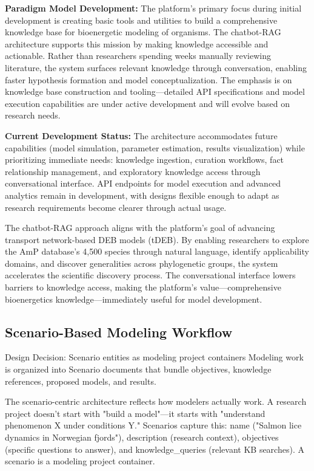 \documentclass[12pt,a4paper]{article}
\begin{document}
\textbf{Paradigm Model Development:} The platform's primary focus during initial development is creating basic tools and utilities to build a comprehensive knowledge base for bioenergetic modeling of organisms. The chatbot-RAG architecture supports this mission by making knowledge accessible and actionable. Rather than researchers spending weeks manually reviewing literature, the system surfaces relevant knowledge through conversation, enabling faster hypothesis formation and model conceptualization. The emphasis is on knowledge base construction and tooling—detailed API specifications and model execution capabilities are under active development and will evolve based on research needs.

\textbf{Current Development Status:} The architecture accommodates future capabilities (model simulation, parameter estimation, results visualization) while prioritizing immediate needs: knowledge ingestion, curation workflows, fact relationship management, and exploratory knowledge access through conversational interface. API endpoints for model execution and advanced analytics remain in development, with designs flexible enough to adapt as research requirements become clearer through actual usage.

The chatbot-RAG approach aligns with the platform's goal of advancing transport network-based DEB models (tDEB). By enabling researchers to explore the AmP database's 4,500 species through natural language, identify applicability domains, and discover generalities across phylogenetic groups, the system accelerates the scientific discovery process. The conversational interface lowers barriers to knowledge access, making the platform's value—comprehensive bioenergetics knowledge—immediately useful for model development.

\subsection{Scenario-Based Modeling Workflow}

\begin{rationale}{Design Decision: Scenario entities as modeling project containers}
Modeling work is organized into Scenario documents that bundle objectives, knowledge references, proposed models, and results.
\end{rationale}

The scenario-centric architecture reflects how modelers actually work. A research project doesn't start with "build a model"—it starts with "understand phenomenon X under conditions Y." Scenarios capture this: name ("Salmon lice dynamics in Norwegian fjords"), description (research context), objectives (specific questions to answer), and knowledge\_queries (relevant KB searches). A scenario is a modeling project container.
\end{document}
